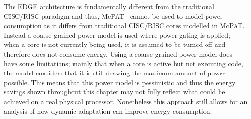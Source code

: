 The EDGE architecture is fundamentally different from the traditional CISC/RISC paradigm and thus, McPAT~\cite{mcpat} cannot be used to model power consumption as it differs from traditional CISC/RISC cores modelled in McPAT.
Instead a coarse-grained power model is used where power gating is applied; when a core is not currently being used, it is assumed to be turned off and therefore does not consume energy.
Using a coarse grained power model does have some limitations; mainly that when a core is active but not executing code, the model considers that it is still drawing the maximum amount of power possible.
This means that this power model is pessimistic and thus the energy savings shown throughout this chapter may not fully reflect what could be achieved on a real physical processor.
Nonetheless this approach still allows for an analysis of how dynamic adaptation can improve energy consumption.
